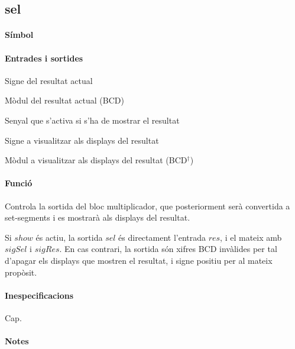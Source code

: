 \subsection{\label{sub:\projectname-sel} \textsf{sel}}

\paragraph{Símbol}

\begin{center}  \end{center}

\paragraph{Entrades i sortides}

\begin{where}
\item[\nodenamebit{sigRes}] Signe del resultat actual
\item[\nodenamerange{res}{7}{0}] Mòdul del resultat actual (BCD)
\item[\nodenamebit{show}] Senyal que s'activa si s'ha de mostrar el resultat
\item[\nodenamebit{sigSel}] Signe a visualitzar als displays del resultat
\item[\nodenamerange{sel}{7}{0}] Mòdul a visualitzar als displays del resultat (BCD$^\dagger$)
\end{where}

\paragraph{Funció}

Controla la sortida del bloc multiplicador, que posteriorment serà convertida a set-segments
i es mostrarà als displays del resultat.

Si $show$ és actiu, la sortida $sel$ és directament l'entrada $res$, i el mateix amb $sigSel$ i $sigRes$.
En cas contrari, la sortida són xifres BCD invàlides per tal d'apagar els displays que mostren el resultat,
i signe positiu per al mateix propòsit.

\paragraph{Inespecificacions}

Cap.

\paragraph{Notes}

